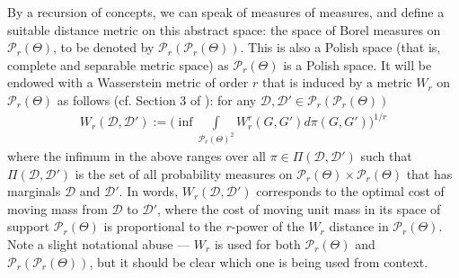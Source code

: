 By a recursion of concepts, we can speak of measures of measures, and define a suitable distance metric
on this abstract space: 
the space of Borel measures on $\mathcal{P}_{r}(\Theta)$, to be denoted by
$\mathcal{P}_{r}(\mathcal{P}_{r}(\Theta))$. This is also a Polish space (that is,
complete and separable metric space) as $
\mathcal{P}_{r}(\Theta)$ is a Polish space. It will be endowed with a Wasserstein metric of 
order $r$ that is induced by a metric $W_{r}$ on $\mathcal{P}_{r}(\Theta)$ as follows (cf. 
Section 3 of \cite{Nguyen-2016}): for any $\mathcal{D},\mathcal{D'} \in \mathcal{P}_r(\mathcal{P}_r(\Theta))$
\vspace{-6pt}
\begin{eqnarray}
W_{r}(\mathcal{D},\mathcal{D}'):=\biggr(\mathop {\inf }{\int \limits_{\mathcal{P}_{r}(\Theta)^{2}}{W_{r}^{r}(G,G')}d\pi(G,G')}\biggr)^{1/r} \nonumber
\end{eqnarray}
where the infimum in the above ranges over all $\pi \in \Pi(\mathcal{D},\mathcal{D}')$ 
such that $\Pi(\mathcal{D},\mathcal{D}')$ is the set of all probability measures on $
\mathcal{P}_{r}(\Theta) \times \mathcal{P}_{r}(\Theta)$ that has marginals $\mathcal{D}
$ and $\mathcal{D}'$. In words, $W_r(\mathcal{D},\mathcal{D'})$ corresponds to 
the optimal cost of moving mass from $\mathcal{D}$ to $\mathcal{D'}$, where
the cost of moving unit mass in its space of support $\mathcal{P}_r(\Theta)$ 
is proportional to the $r$-power of the $W_r$ distance in $\mathcal{P}_r(\Theta)$.
Note a slight notational abuse --- $W_r$ is used for both
$\mathcal{P}_r(\Theta)$ and $\mathcal{P}_r(\mathcal{P}_r(\Theta))$, but
it should be clear which one is being used from context.

